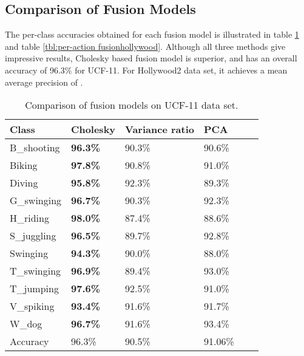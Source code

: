 \subsection{Comparison of Fusion Models}
The per-class accuracies obtained for each fusion model is illustrated in table \ref{tbl:per-action fusionucf} and
table \ref{tbl:per-action fusionhollywood}. Although all three methods give impressive results, Cholesky based fusion
model is superior, and has an overall accuracy of 96.3\% for UCF-11. For Hollywood2 data set, it achieves a mean average precision
of .


\begin{table}[]
\centering
\caption{Comparison of fusion models on UCF-11 data set.}\label{tbl:per-action fusionucf}
\begin{tabular}{|l||l|l|l|l|l|}
\hline
Class            & Cholesky & Variance ratio & PCA   \\ \hline  \hline
B\_shooting       & \textbf{96.3\%}    &  90.3\%   &  90.6\%  \\
Biking           & \textbf{97.8\%}    &  90.8\%   &  91.0\%    \\
Diving           & \textbf{95.8\%}    &  92.3\%   &  89.3\%   \\
G\_swinging       & \textbf{96.7\%}    &  90.3\%   &  92.3\%   \\
H\_riding         & \textbf{98.0\%}    &  87.4\%   &  88.6\%    \\
S\_juggling       & \textbf{96.5\%}    &  89.7\%   &  92.8\%    \\
Swinging         & \textbf{94.3\%}    &  90.0\%   &  88.0\%    \\
T\_swinging       & \textbf{96.9\%}    &  89.4\%   &  93.0\%   \\
T\_jumping        & \textbf{97.6\%}    &  92.5\%   &  91.0\%    \\
V\_spiking        &\textbf{93.4\%}    &  91.6\%   &  91.7\%   \\
W\_dog            & \textbf{96.7\%}    &  91.6\%   &  93.4\%   \\ \hline \hline
Accuracy &  96.3\%   &  90.5\%   &   91.06\%   \\ \hline
\end{tabular}
\end{table}

